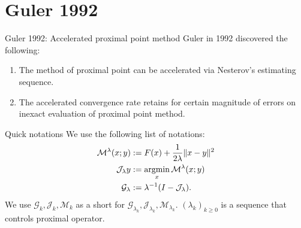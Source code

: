 \documentclass[11pt]{beamer}
\begin{document}
\section{Guler 1992}
    \begin{frame}{Guler 1992: Accelerated proximal point method}
        Guler in 1992 discovered the following: 
        \begin{enumerate}
            \item The method of proximal point can be accelerated via Nesterov's estimating sequence. 
            \item The accelerated convergence rate retains for certain magnitude of errors on inexact evaluation of proximal point method. 
        \end{enumerate}
        \begin{block}{Quick notations}
            We use the following list of notations: 
            \begin{align*}
                \mathcal M^{\lambda} (x; y) &:= F(x) + \frac{1}{2\lambda}\Vert x - y\Vert^2
                \\
                \mathcal J_\lambda y &:= \mathop{\rm argmin}\limits_x \mathcal M^{\lambda} (x; y)
                \\
                \mathcal G_\lambda &:= \lambda^{-1}(I - \mathcal J_\lambda). 
            \end{align*}
            We use $\mathcal G_k, \mathcal J_k, \mathcal M_k$ as a short for $\mathcal G_{\lambda_k}, \mathcal J_{\lambda_k}, \mathcal M_{\lambda_k}$. 
            $(\lambda_k)_{k \ge0}$ is a sequence that controls proximal operator. 
        \end{block}
    \end{frame}
\end{document}
